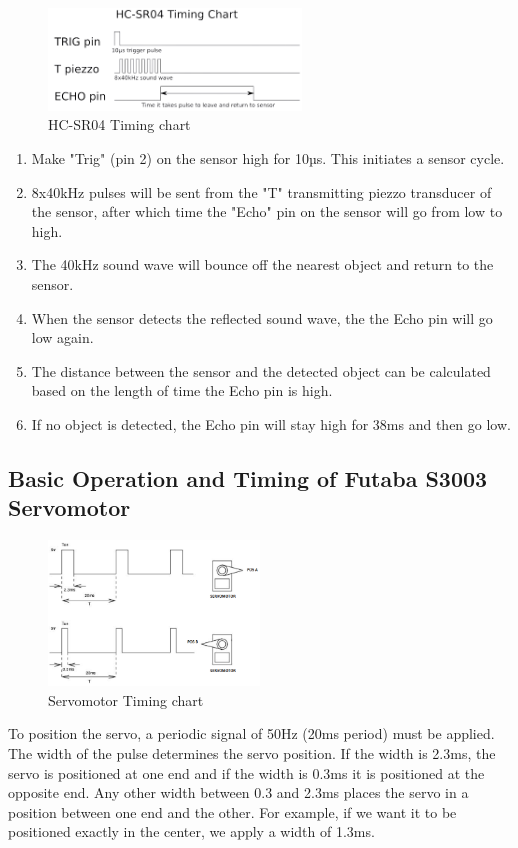     \begin{figure}[H]
        \centering
        \includegraphics[width=0.6\textwidth]{Images/Ball and Bean/HC-SR04-Timing.png}
        \caption{HC-SR04 Timing chart}
        \label{fig20}
    \end{figure}
    \begin{enumerate}
        \item Make "Trig" (pin 2) on the sensor high for 10µs. This initiates a sensor cycle.
        \item 8x40kHz pulses will be sent from the "T" transmitting piezzo transducer of the sensor, after which time the "Echo" pin on the sensor will go from low to high.
        \item The 40kHz sound wave will bounce off the nearest object and return to the sensor.
        \item When the sensor detects the reflected sound wave, the the Echo pin will go low again.
        \item The distance between the sensor and the detected object can be calculated based on the length of time the Echo pin is high.
        \item If no object is detected, the Echo pin will stay high for 38ms and then go low.
    \end{enumerate}
    
\subsection{Basic Operation and Timing of Futaba S3003 Servomotor}
    \begin{figure}[H]
        \centering
        \includegraphics[width=0.5\textwidth]{Images/Ball and Bean/Servo2.png}
        \caption{Servomotor Timing chart}
        \label{fig21}
    \end{figure}
To position the servo, a periodic signal of 50Hz (20ms period) must be applied. The width of the pulse determines the servo position. If the width is 2.3ms, the servo is positioned at one end and if the width is 0.3ms it is positioned at the opposite end. Any other width between 0.3 and 2.3ms places the servo in a position between one end and the other. For example, if we want it to be positioned exactly in the center, we apply a width of 1.3ms.

